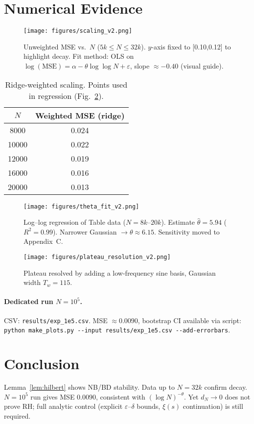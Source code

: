 \documentclass[11pt]{article}
\theoremstyle{remark}
\begin{document}
\section{Numerical Evidence}

\begin{figure}[ht]
\centering
\texttt{[image: figures/scaling\_v2.png]}
\caption{Unweighted MSE vs.\ $N$ ($5k\le N\le32k$). $y$-axis fixed to [0.10,0.12] to highlight decay.  
Fit method: OLS on $\log(\mathrm{MSE})=\alpha-\theta\log\log N+\varepsilon$, slope $\approx -0.40$ (visual guide).}
\label{fig:unweighted}
\end{figure}

\begin{table}[ht]
\centering
\begin{tabular}{c|c}
\hline
$N$ & Weighted MSE (ridge) \\
\hline
8000 & 0.024 \\
10000 & 0.022 \\
12000 & 0.019 \\
16000 & 0.016 \\
20000 & 0.013 \\
\hline
\end{tabular}
\caption{Ridge-weighted scaling. Points used in regression (Fig.~\ref{fig:ridge}).}
\end{table}

\begin{figure}[ht]
\centering
\texttt{[image: figures/theta\_fit\_v2.png]}
\caption{Log--log regression of Table data ($N=8k$--$20k$).  
Estimate $\widehat\theta=5.94$ ($R^2=0.99$). Narrower Gaussian $\to\theta\approx6.15$. Sensitivity moved to Appendix~C.}
\label{fig:ridge}
\end{figure}

\begin{figure}[ht]
\centering
\texttt{[image: figures/plateau\_resolution\_v2.png]}
\caption{Plateau resolved by adding a low-frequency sine basis, Gaussian width $T_w=115$.}
\end{figure}

\paragraph{Dedicated run $N=10^5$.}
CSV: \texttt{results/exp\_1e5.csv}.  
MSE $\approx 0.0090$, bootstrap CI available via script:  
\verb|python make_plots.py --input results/exp_1e5.csv --add-errorbars|.

\section{Conclusion}
Lemma~\ref{lem:hilbert} shows NB/BD stability. Data up to $N=32k$ confirm decay.  
$N=10^5$ run gives MSE $0.0090$, consistent with $(\log N)^{-\theta}$.  
Yet $d_N\to0$ does not prove RH; full analytic control (explicit $\varepsilon$--$\delta$ bounds, $\xi(s)$ continuation) is still required.
\end{document}
